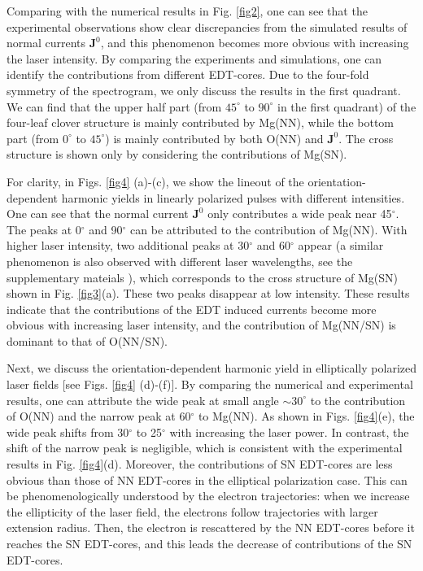 \documentclass[aps,prl,10pt,preprint,nofootinbib]{revtex4-1}
\begin{document}
Comparing with the numerical results in Fig. \ref{fig2}, one can see that the experimental observations show clear discrepancies from the simulated results of normal currents $\textbf{J}^{0}$, and this phenomenon becomes more obvious with increasing the laser intensity. By comparing the experiments and simulations, one can identify the contributions from different EDT-cores. Due to the four-fold symmetry of the spectrogram, we only discuss the results in the first quadrant. We can find that the upper half part (from $45^\circ$ to $90^\circ$ in the first quadrant) of the four-leaf clover structure is mainly contributed by Mg(NN), while the bottom part (from $0^\circ$ to $45^\circ$) is mainly contributed by both O(NN) and $\textbf{J}^{0}$. The cross structure is shown only by considering the contributions of Mg(SN).


For clarity, in Figs. \ref{fig4} (a)-(c), we show the lineout of the orientation-dependent harmonic yields in linearly polarized pulses with different intensities. One can see that the normal current $\textbf{J}^{0}$ only contributes a wide peak near 45$^\circ$. The peaks at 0$^\circ$ and 90$^\circ$ can be attributed to the contribution of Mg(NN). With higher laser intensity, two additional peaks at 30$^\circ$ and 60$^\circ$ appear (a similar phenomenon is also observed with different laser wavelengths, see the supplementary mateials \cite{SM}), which corresponds to the cross structure of Mg(SN) shown in Fig. \ref{fig3}(a). These two peaks disappear at low intensity. These results indicate that the contributions of the EDT induced currents become more obvious with increasing laser intensity, and the contribution of Mg(NN/SN) is dominant to that of O(NN/SN).


Next, we discuss the orientation-dependent harmonic yield in elliptically polarized laser fields [see Figs. \ref{fig4} (d)-(f)]. By comparing the numerical and experimental results, one can attribute the wide peak at small angle $\sim30^\circ$ to the contribution of O(NN) and the narrow peak at 60$^\circ$ to Mg(NN). As shown in Figs. \ref{fig4}(e), the wide peak shifts from 30$^\circ$ to 25$^\circ$ with increasing the laser power. In contrast, the shift of the narrow peak is negligible, which is consistent with the experimental results in Fig. \ref{fig4}(d). Moreover, the contributions of SN EDT-cores are less obvious than those of NN EDT-cores in the elliptical polarization case. This can be phenomenologically understood by the electron trajectories: when we increase the ellipticity of the laser field, the electrons follow trajectories with larger extension radius. Then, the electron is rescattered by the NN EDT-cores before it reaches the SN EDT-cores, and this leads the decrease of contributions of the SN EDT-cores.  
\end{document}
